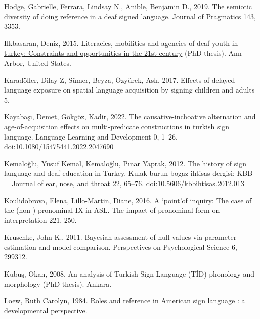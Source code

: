 \documentclass[]{elsarticle} %
\newlength{\cslhangindent}
\newenvironment{CSLReferences}[2] %
 {%
  \setlength{\parindent}{0pt}
  \ifodd #1 \everypar{\setlength{\hangindent}{\cslhangindent}}\ignorespaces\fi
  \ifnum #2 > 0
  \setlength{\parskip}{#2\baselineskip}
  \fi
 }%
 {}
\begin{document}
\begin{CSLReferences}{1}{0}
\leavevmode{}%
Hodge, Gabrielle, Ferrara, Lindsay N., Anible, Benjamin D., 2019. The
semiotic diversity of doing reference in a deaf signed language. Journal
of Pragmatics 143, 3353.

\leavevmode{}%
Ilkbasaran, Deniz, 2015.
\href{https://www.proquest.com/docview/1656169535/abstract/16EA71911A644FC3PQ/1}{Literacies,
mobilities and agencies of deaf youth in turkey: Constraints and
opportunities in the 21st century} (PhD thesis). Ann Arbor, United
States.

\leavevmode{}%
Karadöller, Dilay Z, Sümer, Beyza, Özyürek, Aslı, 2017. Effects of
delayed language exposure on spatial language acquisition by signing
children and adults 5.

\leavevmode{}%
Kayabaşı, Demet, Gökgöz, Kadir, 2022. The causative-inchoative
alternation and age-of-acquisition effects on multi-predicate
constructions in turkish sign language. Language Learning and
Development 0, 1--26.
doi:\href{https://doi.org/10.1080/15475441.2022.2047690}{10.1080/15475441.2022.2047690}

\leavevmode{}%
Kemaloğlu, Yusuf Kemal, Kemaloğlu, Pınar Yaprak, 2012. The history of
sign language and deaf education in Turkey. Kulak burun bogaz ihtisas
dergisi: KBB = Journal of ear, nose, and throat 22, 65--76.
doi:\href{https://doi.org/10.5606/kbbihtisas.2012.013}{10.5606/kbbihtisas.2012.013}

\leavevmode{}%
Koulidobrova, Elena, Lillo-Martin, Diane, 2016. A {`}point{'}of inquiry:
The case of the (non-) pronominal IX in ASL. The impact of pronominal
form on interpretation 221, 250.

\leavevmode{}%
Kruschke, John K., 2011. Bayesian assessment of null values via
parameter estimation and model comparison. Perspectives on Psychological
Science 6, 299312.

\leavevmode{}%
Kubuş, Okan, 2008. An analysis of Turkish Sign Language (T{İ}D)
phonology and morphology (PhD thesis). Ankara.

\leavevmode{}%
Loew, Ruth Carolyn, 1984.
\href{https:///paper/Roles-and-reference-in-American-sign-language-\%3A-a-Loew/315c2c539d3bd88fbc13564775141ba4a60ac5aa}{Roles
and reference in American sign language : a developmental perspective}.


\end{CSLReferences}
\end{document}
